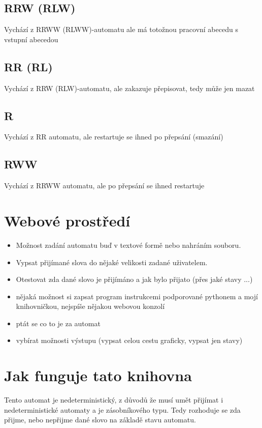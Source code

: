 \documentclass{article}
\begin{document}
\subsection{RRW (RLW)}
Vychází z RRWW (RLWW)-automatu ale má totožnou pracovní abecedu s vstupní abecedou

\subsection{RR (RL)}
Vychází z RRW (RLW)-automatu, ale zakazuje přepisovat, tedy může jen mazat

\subsection{R}
Vychází z RR automatu, ale restartuje se ihned po přepsání (smazání)

\subsection{RWW}
Vychází z RRWW automatu, ale po přepsání se ihned restartuje

\section{Webové prostředí}
\begin{itemize}
	\item Možnost zadání automatu buď v textové formě nebo nahráním souboru.
	\item Vypsat přijímané slova do nějaké velikosti zadané uživatelem.
	\item Otestovat zda dané slovo je přijímáno a jak bylo přijato (přes jaké stavy ...)
	\item nějaká možnost si zapsat program instrukcemi podporované pythonem a mojí knihovničkou, nejspíše nějakou webovou konzolí
	\item ptát se co to je za automat
	\item vybírat možnosti výstupu (vypsat celou cestu graficky, vypsat jen stavy)
\end{itemize}

\section{Jak funguje tato knihovna}

Tento automat je nedeterministický, z důvodů že musí umět přijímat i nedeterministické automaty
a je zásobníkového typu.
Tedy rozhoduje se zda přijme, nebo nepřijme dané slovo na základě stavu automatu.
\end{document}
